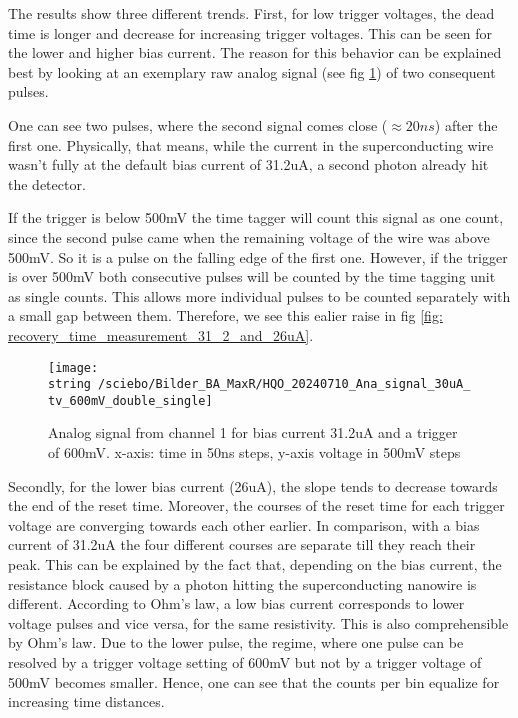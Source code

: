 The results show three different trends.
First, for low trigger voltages, the dead time is longer and decrease for increasing trigger voltages.
This can be seen for the lower and higher bias current.
The reason for this behavior can be explained best by looking at an exemplary raw analog signal (see fig \ref{fig: analog_signal_31_2_uA_double_peak})
of two consequent pulses.

One can see two pulses, where the second signal comes close ($\approx 20ns$) after the first one.
Physically, that means, while the current in the superconducting wire wasn't fully at the default bias current of
31.2uA, a second photon already hit the detector.

If the trigger is below 500mV the time tagger will count this signal as one count, since the second pulse came when
the remaining voltage of the wire was above 500mV.
So it is a pulse on the falling edge of the first one.
However, if the trigger is over 500mV both consecutive pulses will be counted by the time tagging unit as single counts.
This allows more individual pulses to be counted separately with a small gap between them. 
Therefore, we see this ealier raise in fig \ref{fig: recovery_time_measurement_31_2_and_26uA}.

\begin{figure}[H]
 \centering
 \texttt{[image: \\string~/sciebo/Bilder\_BA\_MaxR/HQO\_20240710\_Ana\_signal\_30uA\_tv\_600mV\_double\_single]}
 \caption{Analog signal from channel 1 for bias current 31.2uA and a trigger of 600mV. x-axis: time in 50ns steps, y-axis
 voltage in 500mV steps}
 \label{fig: analog_signal_31_2_uA_double_peak}
\end{figure}

Secondly, for the lower bias current (26uA), the slope tends to decrease towards the end of the reset time.
Moreover, the courses of the reset time for each trigger voltage are converging towards each other earlier.
In comparison, with a bias current of 31.2uA the four different courses are separate till they reach their peak.
This can be explained by the fact that, depending on the bias current, the resistance block caused by a
photon hitting the superconducting nanowire is different.
According to Ohm's law, a low bias current corresponds to lower voltage pulses and vice versa, for the same resistivity.
This is also comprehensible by Ohm's law.
Due to the lower pulse, the regime, where one pulse can be resolved by a trigger voltage setting of 600mV but not by a
trigger voltage of 500mV becomes smaller.
Hence, one can see that the counts per bin equalize for increasing time distances.


